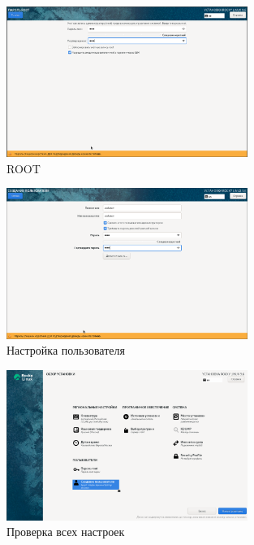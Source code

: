 \documentclass[
  12pt,
  a4paper,
  DIV=11,
  numbers=noendperiod]{scrreprt}
\begin{document}
\begin{figure}

{\centering \includegraphics[width=0.7\textwidth,height=\textheight]{image/10.png}

}

\caption{ROOT}

\end{figure}%
\begin{figure}

{\centering \includegraphics[width=0.7\textwidth,height=\textheight]{image/11.png}

}

\caption{Настройка пользователя}

\end{figure}%
\begin{figure}

{\centering \includegraphics[width=0.7\textwidth,height=\textheight]{image/12.png}

}

\caption{Проверка всех настроек}

\end{figure}%
\end{document}
